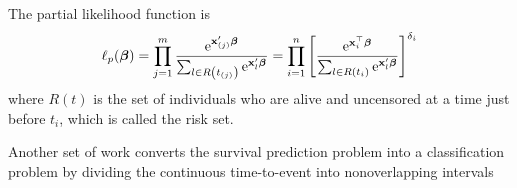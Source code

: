 The partial likelihood function is
\begin{equation}
	\ell_{p}(\boldsymbol{\beta})=\prod_{j=1}^{m}\frac{\mathrm{e}^{\mathbf{x}_{(j)}^{\prime}\boldsymbol{\beta}}}{\sum_{l\in R\left(t_{(j)}\right)}\mathrm{e}^{\mathbf{x}_{l}^{\prime}\boldsymbol{\beta}}}=\prod_{i=1}^{n}\left[\frac{\mathrm{e}^{\mathbf{x}_{i}^{\top}\boldsymbol{\beta}}}{\sum_{l\in R\left(t_{i}\right)}\mathrm{e}^{\mathbf{x}_{l}^{\prime}\boldsymbol{\beta}}}\right]^{\delta_{i}}
\end{equation}
where \(R(t)\) is the set of individuals who are alive and uncensored at a time just before \(t_{i}\), which is called the risk set.

Another set of work converts the survival prediction problem into a classification problem by dividing the continuous time-to-event into nonoverlapping intervals
